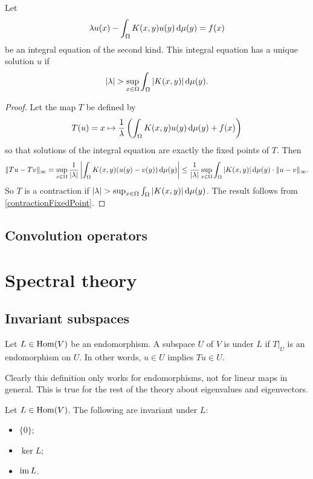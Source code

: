 \begin{proposition}
Let
\[ \lambda u(x) - \int_\Omega K(x,y)u(y)\operatorname{d \!}{\mu(y)} = f(x)\]
be an integral equation of the second kind. This integral equation has a unique solution $u$ if
\[ |\lambda| > \sup_{x\in \Omega} \int_{\Omega}|K(x,y)|\operatorname{d \!}{\mu(y)}. \]
\end{proposition}
\begin{proof}
Let the map $T$ be defined by
\[ T(u) = x\mapsto \frac{1}{\lambda}\left(\int_\Omega K(x,y)u(y)\operatorname{d \!}{\mu(y)} + f(x)\right) \]
so that solutions of the integral equation are exactly the fixed points of $T$. Then
\[ \lVert Tu-Tv\rVert_\infty = \sup_{x\in\Omega} \frac{1}{|\lambda|} \left|\int_\Omega K(x,y)(u(y)- v(y))\operatorname{d \!}{\mu(y)}\right| \leq \frac{1}{|\lambda|} \sup_{x\in \Omega} \int_{\Omega}|K(x,y)|\operatorname{d \!}{\mu(y)} \cdot \lVert u-v\rVert_\infty. \]
So $T$ is a contraction if $|\lambda| > \sup_{x\in \Omega} \int_{\Omega}|K(x,y)|\operatorname{d \!}{\mu(y)}$. The result follows from \ref{contractionFixedPoint}.
\end{proof}

\section{Convolution operators}




\chapter{Spectral theory}
\section{Invariant subspaces}
\begin{definition}
Let $L\in \operatorname{Hom}(V)$ be an endomorphism. A subspace $U$ of $V$ is  under $L$ if $T|_U$ is an endomorphism on $U$. In other words, $u\in U$ implies $Tu\in U$.
\end{definition}
Clearly this definition only works for endomorphisms, not for linear maps in general. This is true for the rest of the theory about eigenvalues and eigenvectors.
\begin{example}
Let $L\in \operatorname{Hom}(V)$. The following are invariant under $L$:
\begin{itemize}
\item $\{0\}$;
\item $\ker L$;
\item $\operatorname{im} L$.
\end{itemize}
\end{example}

